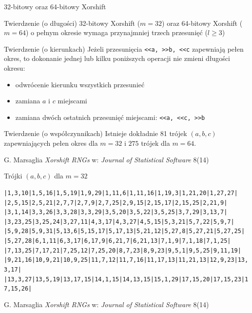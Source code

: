 \documentclass{mp}
\begin{document}
\begin{frame}{32-bitowy oraz 64-bitowy Xorshift}
\begin{block}{Twierdzenie (o długości)}
32-bitowy Xorshift ($m=32$) oraz 64-bitowy Xorshift ($m=64$) o pełnym okresie wymaga przynajmniej trzech przesunięć ($l\geq 3$) 
\end{block}
\pause
\begin{block}{Twierdzenie (o kierunkach)}
Jeżeli przesunięcia \texttt{<<a, >>b, <<c} zapewniają pełen okres, to dokonanie jednej lub kilku poniższych operacji nie zmieni długości okresu:
\begin{itemize}
\item odwrócenie kierunku wszystkich przesunieć
\item zamiana $a$ i $c$ miejscami
\item zamiana dwóch ostatnich przesunięć miejscami: \texttt{<<a, <<c, >>b}
\end{itemize}
\end{block}
\pause
\begin{block}{Twierdzenie (o współczynnikach)}
Istnieje dokładnie 81 trójek $(a,b,c)$ zapewniających pełen okres dla $m=32$ i $275$ trójek dla $m=64$.
\end{block}
\vfill
{\footnotesize G. Marsaglia \emph{Xorshift RNGs} w: \emph{Journal of Statistical Software} 8(14)}
\end{frame}
\begin{frame}{Trójki $(a,b,c)$ dla $m=32$}
\scriptsize
\begin{alltt}
| 1, 3,10| 1, 5,16| 1, 5,19| 1, 9,29| 1,11, 6| 1,11,16| 1,19, 3| 1,21,20| 1,27,27| \\
| 2, 5,15| 2, 5,21| 2, 7, 7| 2, 7, 9| 2, 7,25| 2, 9,15| 2,15,17| 2,15,25| 2,21, 9| \\
| 3, 1,14| 3, 3,26| 3, 3,28| 3, 3,29| 3, 5,20| 3, 5,22| 3, 5,25| 3, 7,29| 3,13, 7| \\
| 3,23,25| 3,25,24| 3,27,11| 4, 3,17| 4, 3,27| 4, 5,15| 5, 3,21| 5, 7,22| 5, 9,7 | \\
| 5, 9,28| 5, 9,31| 5,13, 6| 5,15,17| 5,17,13| 5,21,12| 5,27, 8| 5,27,21| 5,27,25| \\
| 5,27,28| 6, 1,11| 6, 3,17| 6,17, 9| 6,21, 7| 6,21,13| 7, 1, 9| 7, 1,18| 7, 1,25| \\
| 7,13,25| 7,17,21| 7,25,12| 7,25,20| 8, 7,23| 8,9,23 | 9, 5,1 | 9, 5,25| 9,11,19| \\
| 9,21,16|10, 9,21|10, 9,25|11, 7,12|11, 7,16|11,17,13|11,21,13|12, 9,23|13, 3,17| \\
|13, 3,27|13, 5,19|13,17,15|14, 1,15|14,13,15|15, 1,29|17,15,20|17,15,23|17,15,26| \\
\end{alltt}
\vfill
{\footnotesize G. Marsaglia \emph{Xorshift RNGs} w: \emph{Journal of Statistical Software} 8(14)}
\end{frame}
\end{document}
